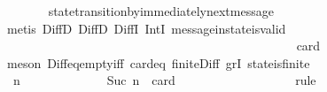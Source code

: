 \begin{isabellebody}
\ \ \ \ \ \ \isamarkupfalse%
\ state{\isacharunderscore}transition{\isacharunderscore}by{\isacharunderscore}immediately{\isacharunderscore}next{\isacharunderscore}message\isanewline
\ \ \ \ \ \ \isamarkupfalse%
\ {\isacharparenleft}metis\ DiffD{}\ DiffD{}\ DiffI\ IntI\ message{\isacharunderscore}in{\isacharunderscore}state{\isacharunderscore}is{\isacharunderscore}valid{\isacharparenright}\ \ \ \ \ \ \isanewline
\ \ \ \ \isamarkupfalse%
\ {\isachardoublequoteopen}{\isasymforall}\ {\isasymsigma}\ {\isasymin}\ {\isasymSigma}{\isachardot}\ {\isasymforall}\ {\isasymsigma}{\isacharprime}\ {\isasymin}\ {\isasymSigma}{\isachardot}\ {\isasymnot}\ {\isasymsigma}\ {\isasymsubseteq}\ {\isasymsigma}{\isacharprime}\ {\isasymlongrightarrow}\ \ {\isasymsigma}\ {\isasymunion}\ {\isasymsigma}{\isacharprime}\ {\isasymin}\ {\isasymSigma}{\isachardoublequoteclose}\isanewline
\ \ \ \ \isamarkupfalse%
\ {\isacharminus}\ \isanewline
\ \ \ \ \ \ \isamarkupfalse%
\ {\isachardoublequoteopen}{\isasymforall}\ {\isasymsigma}\ {\isasymin}\ {\isasymSigma}{\isachardot}\ {\isasymforall}\ {\isasymsigma}{\isacharprime}\ {\isasymin}\ {\isasymSigma}{\isachardot}\ {\isasymnot}\ {\isasymsigma}\ {\isasymsubseteq}\ {\isasymsigma}{\isacharprime}\ {\isasymlongrightarrow}\ card\ {\isacharparenleft}{\isasymsigma}\ {\isacharminus}\ {\isasymsigma}{\isacharprime}{\isacharparenright}\ {\isachargreater}\ {}{\isachardoublequoteclose}\isanewline
\ \ \ \ \ \ \ \ \isamarkupfalse%
\ {\isacharparenleft}meson\ Diff{\isacharunderscore}eq{\isacharunderscore}empty{\isacharunderscore}iff\ card{\isacharunderscore}{}{\isacharunderscore}eq\ finite{\isacharunderscore}Diff\ gr{}I\ state{\isacharunderscore}is{\isacharunderscore}finite{\isacharparenright}\isanewline
\ \ \ \ \ \ \isamarkupfalse%
\ {\isachardoublequoteopen}{\isasymforall}\ n{\isachardot}\ {\isasymforall}\ {\isasymsigma}\ {\isasymin}\ {\isasymSigma}{\isachardot}\ {\isasymforall}\ {\isasymsigma}{\isacharprime}\ {\isasymin}\ {\isasymSigma}{\isachardot}\ {\isasymnot}\ {\isasymsigma}\ {\isasymsubseteq}\ {\isasymsigma}{\isacharprime}\ {\isasymand}\ Suc\ n\ {\isacharequal}\ card\ {\isacharparenleft}{\isasymsigma}\ {\isacharminus}\ {\isasymsigma}{\isacharprime}{\isacharparenright}{\isasymlongrightarrow}\ \ {\isasymsigma}\ {\isasymunion}\ {\isasymsigma}{\isacharprime}\ {\isasymin}\ {\isasymSigma}{\isachardoublequoteclose}\isanewline
\ \ \ \ \ \ \ \ \isamarkupfalse%
\ {\isacharparenleft}rule{\isacharparenright}\isanewline

\end{isabellebody}
